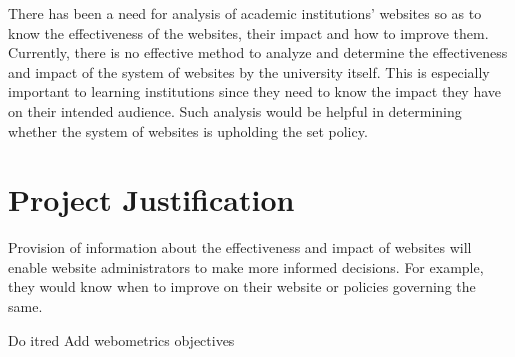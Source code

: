 \noindent
There has been a need for analysis of academic institutions' websites so as to know the effectiveness of the websites, their impact and how to improve them. Currently, there is no effective method to analyze and determine the effectiveness and impact of the system of websites by the university itself. This is especially important to learning institutions since they need to know the impact they have on their intended audience.  Such analysis would be helpful in determining whether the system of websites is upholding the set policy.


\section{Project Justification}
\noindent
Provision of information about the effectiveness and impact of websites will enable website administrators to make more informed decisions. For example, they would know when to improve on their website or policies governing the same.
\begin{review_comment}{Do it}{red}
{Add webometrics objectives}
\end{review_comment}

